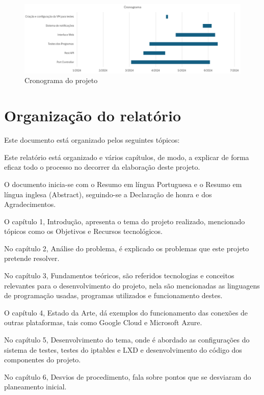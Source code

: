 \begin{figure}[H]
\begin{center}
\includegraphics[width=16cm]{figs/cronograma.png}
\caption{Cronograma do projeto}
\label{fig:bookstack}
\end{center}
\end{figure}


\section{Organização do relatório}
\label{sec:intro_struct}

Este documento está organizado pelos seguintes tópicos:

Este relatório está organizado e vários capítulos, de modo, a explicar de forma
eficaz todo o processo no decorrer da elaboração deste projeto.

O documento inicia-se com o Resumo em língua Portuguesa e o Resumo em língua 
inglesa (Abstract), seguindo-se a Declaração de honra e dos Agradecimentos.

O capítulo 1, Introdução, apresenta o tema do projeto realizado, mencionado tópicos
como os Objetivos e Recursos tecnológicos.

No capítulo 2, Análise do problema, é explicado os problemas que este projeto 
pretende resolver.

No capítulo 3, Fundamentos teóricos, são referidos tecnologias e conceitos relevantes 
para o desenvolvimento do projeto, nela são mencionadas as linguagens de programação usadas,
programas utilizados e funcionamento destes.

O capítulo 4, Estado da Arte, dá exemplos do funcionamento das conexões de outras 
plataformas, tais como Google Cloud e Microsoft Azure.

No capítulo 5, Desenvolvimento do tema, onde é abordado as configurações do sistema
de testes, testes do iptables e LXD e desenvolvimento do código dos componentes 
do projeto.


No capítulo 6, Desvios de procedimento, fala sobre pontos que se desviaram do planeamento inicial.


